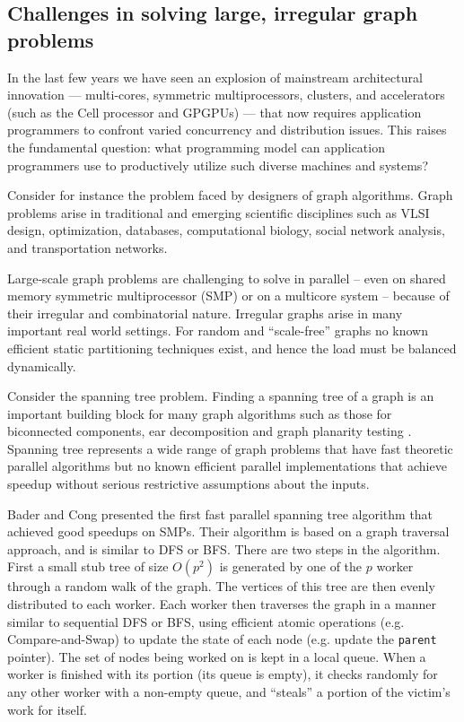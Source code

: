 \subsection{Challenges in solving large, irregular graph problems}
In the last few years we have seen an explosion of mainstream architectural
innovation --- multi-cores, symmetric multiprocessors, clusters, and
accelerators (such as the Cell processor and GPGPUs) --- that now
requires application programmers to confront varied concurrency and
distribution issues. This raises the fundamental question: what
programming model can application programmers use to productively utilize
such diverse machines and systems?

Consider for instance the problem faced by designers of graph
algorithms.  Graph problems arise in traditional and
emerging scientific disciplines such as VLSI design, optimization,
databases, computational biology, social network analysis, and
transportation networks.

Large-scale graph problems are challenging to solve in parallel --
even on shared memory symmetric multiprocessor (SMP) or on a multicore
system -- because of their irregular and combinatorial nature.
Irregular graphs arise in many important real world settings. For
random and ``scale-free'' graphs \cite{CZF04} no known efficient
static partitioning techniques exist, and hence the load must be
balanced dynamically.  

Consider the spanning tree problem. Finding a spanning tree of a graph
is an important building block for many graph algorithms such as those for
biconnected components, ear decomposition \cite{MR86} and graph planarity testing \cite{KR88}.  Spanning tree represents
a wide range of graph problems that have fast theoretic parallel
algorithms but no known efficient parallel implementations that
achieve speedup without serious restrictive assumptions about the
inputs.

Bader and Cong \cite{BC04a} presented the first fast parallel spanning
tree algorithm that achieved good speedups on SMPs. Their algorithm is
based on a graph traversal approach, and is similar to DFS or BFS.
There are two steps in the algorithm. First a small stub tree of size
$O(p^2)$ is generated by one of the $p$ worker through a random walk of the
graph. The vertices of this tree are then evenly distributed to each
worker.  Each worker then traverses the graph in a manner similar to
sequential DFS or BFS, using efficient atomic operations (e.g.{}
Compare-and-Swap) to update the state of each node (e.g.{} update the
{\tt parent} pointer). The set of nodes being worked on is kept in a
local queue.  When a worker is finished with its portion (its queue is
empty), it checks randomly for any other worker with a non-empty
queue, and ``steals'' a portion of the victim's work for itself.

